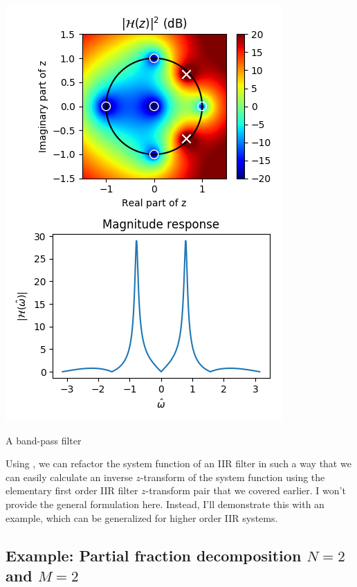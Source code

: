 \begin{marginfigure}
    \includegraphics[width=\textwidth]{code/026_iir/ex6.png}
    \caption{A band-pass filter}
    \label{fig:pzex4}
\end{marginfigure}

Using \emph{}, we can refactor the system function of an IIR filter
in such a way that we can easily calculate an inverse $z$-transform of
the system function using the elementary first order IIR filter
$z$-transform pair that we covered earlier. I won't provide the general
formulation here. Instead, I'll demonstrate this with an example,
which can be generalized for higher order IIR systems.

\subsection{Example: Partial fraction decomposition $N=2$ and $M=2$}

